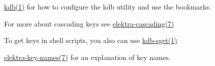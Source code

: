\begin{DoxyItemize}
\item \hyperlink{md_doc_help_kdb_doc_help_kdb_md}{kdb(1)} for how to configure the kdb utility and use the bookmarks.
\item For more about cascading keys see \hyperlink{md_doc_help_elektra-cascading_doc_help_elektra-cascading_md}{elektra-\/cascading(7)}
\item To get keys in shell scripts, you also can use \hyperlink{md_doc_help_kdb-sget_doc_help_kdb-sget_md}{kdb-\/sget(1)}
\item \hyperlink{md_doc_help_elektra-key-names_doc_help_elektra-key-names_md}{elektra-\/key-\/names(7)} for an explanation of key names. 
\end{DoxyItemize}